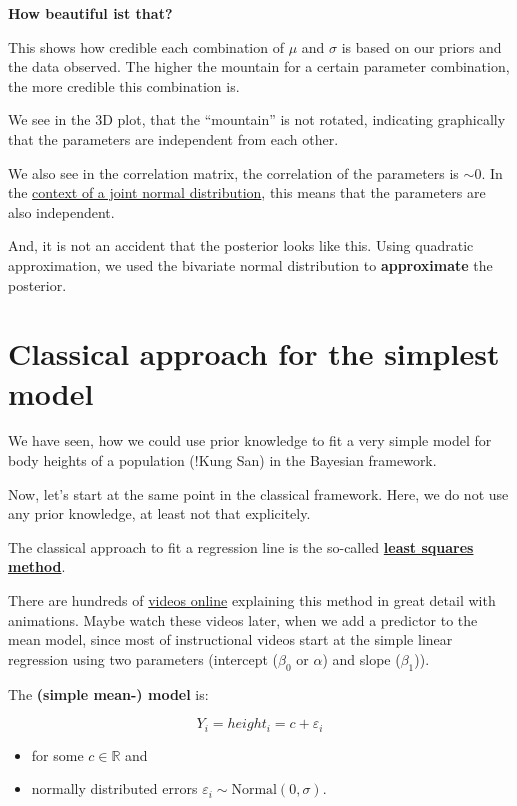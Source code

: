 \documentclass[
]{book}
\providecommand{\tightlist}{%
  \setlength{\itemsep}{0pt}\setlength{\parskip}{0pt}}
\begin{document}
\textbf{How beautiful ist that?}

This shows how credible each combination of \(\mu\) and \(\sigma\) is based on our priors and the data observed.
The higher the mountain for a certain parameter combination, the more credible this combination is.

We see in the 3D plot, that the ``mountain'' is not rotated, indicating
graphically that the parameters are independent from each other.

We also see in the correlation matrix, the correlation of the parameters is \(\sim 0\).
In the \href{https://en.wikipedia.org/wiki/Correlation\#Correlation_and_independence}{context of a joint normal distribution},
this means that the parameters are also independent.

And, it is not an accident that the posterior looks like this. Using quadratic approximation,
we used the bivariate normal distribution to \textbf{approximate} the posterior.

\section{Classical approach for the simplest model}\label{classical_simple_mean_model}

We have seen, how we could use prior knowledge to fit a very simple model
for body heights of a population (!Kung San) in the Bayesian framework.

Now, let's start at the same point in the classical framework.
Here, we do not use any prior knowledge, at least not that explicitely.

The classical approach to fit a regression line is the so-called
\textbf{\href{https://en.wikipedia.org/wiki/Least_squares}{least squares method}}.

There are hundreds of \href{https://www.youtube.com/results?search_query=linear+regression}{videos online}
explaining this method in great detail
with animations. Maybe watch these videos later, when we add a predictor to the mean model,
since most of instructional videos start at the simple linear regression using
two parameters (intercept (\(\beta_0\) or \(\alpha\)) and slope (\(\beta_1\))).

The \textbf{(simple mean-) model} is:

\[ Y_i = height_i = c + \varepsilon_i \]

\begin{itemize}
\tightlist
\item
  for some \(c \in \mathbb{R}\) and
\item
  normally distributed errors \(\varepsilon_i \sim \text{Normal}(0, \sigma)\).
\end{itemize}
\end{document}
